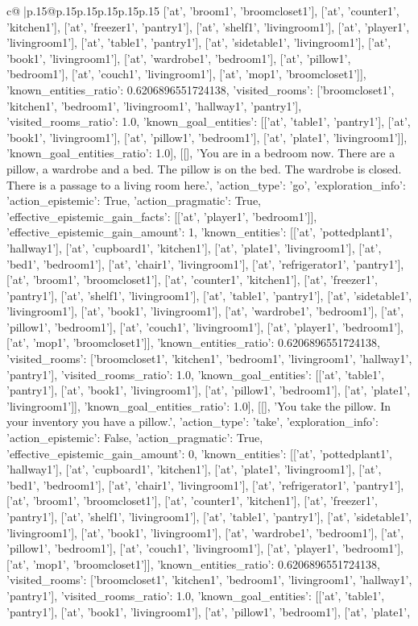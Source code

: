\documentclass{article}
\begin{document}
{\begin{supertabular}{c@{$\;$}|p{.15\linewidth}@{}p{.15\linewidth}p{.15\linewidth}p{.15\linewidth}p{.15\linewidth}p{.15\linewidth}}
{{{['at', 'broom1', 'broomcloset1'], ['at', 'counter1', 'kitchen1'], ['at', 'freezer1', 'pantry1'], ['at', 'shelf1', 'livingroom1'], ['at', 'player1', 'livingroom1'], ['at', 'table1', 'pantry1'], ['at', 'sidetable1', 'livingroom1'], ['at', 'book1', 'livingroom1'], ['at', 'wardrobe1', 'bedroom1'], ['at', 'pillow1', 'bedroom1'], ['at', 'couch1', 'livingroom1'], ['at', 'mop1', 'broomcloset1']], 'known_entities_ratio': 0.6206896551724138, 'visited_rooms': ['broomcloset1', 'kitchen1', 'bedroom1', 'livingroom1', 'hallway1', 'pantry1'], 'visited_rooms_ratio': 1.0, 'known_goal_entities': [['at', 'table1', 'pantry1'], ['at', 'book1', 'livingroom1'], ['at', 'pillow1', 'bedroom1'], ['at', 'plate1', 'livingroom1']], 'known_goal_entities_ratio': 1.0}}], [[], 'You are in a bedroom now. There are a pillow, a wardrobe and a bed. The pillow is on the bed. The wardrobe is closed. There is a passage to a living room here.', {'action_type': 'go', 'exploration_info': {'action_epistemic': True, 'action_pragmatic': True, 'effective_epistemic_gain_facts': [['at', 'player1', 'bedroom1']], 'effective_epistemic_gain_amount': 1, 'known_entities': [['at', 'pottedplant1', 'hallway1'], ['at', 'cupboard1', 'kitchen1'], ['at', 'plate1', 'livingroom1'], ['at', 'bed1', 'bedroom1'], ['at', 'chair1', 'livingroom1'], ['at', 'refrigerator1', 'pantry1'], ['at', 'broom1', 'broomcloset1'], ['at', 'counter1', 'kitchen1'], ['at', 'freezer1', 'pantry1'], ['at', 'shelf1', 'livingroom1'], ['at', 'table1', 'pantry1'], ['at', 'sidetable1', 'livingroom1'], ['at', 'book1', 'livingroom1'], ['at', 'wardrobe1', 'bedroom1'], ['at', 'pillow1', 'bedroom1'], ['at', 'couch1', 'livingroom1'], ['at', 'player1', 'bedroom1'], ['at', 'mop1', 'broomcloset1']], 'known_entities_ratio': 0.6206896551724138, 'visited_rooms': ['broomcloset1', 'kitchen1', 'bedroom1', 'livingroom1', 'hallway1', 'pantry1'], 'visited_rooms_ratio': 1.0, 'known_goal_entities': [['at', 'table1', 'pantry1'], ['at', 'book1', 'livingroom1'], ['at', 'pillow1', 'bedroom1'], ['at', 'plate1', 'livingroom1']], 'known_goal_entities_ratio': 1.0}}], [[], 'You take the pillow. In your inventory you have a pillow.', {'action_type': 'take', 'exploration_info': {'action_epistemic': False, 'action_pragmatic': True, 'effective_epistemic_gain_amount': 0, 'known_entities': [['at', 'pottedplant1', 'hallway1'], ['at', 'cupboard1', 'kitchen1'], ['at', 'plate1', 'livingroom1'], ['at', 'bed1', 'bedroom1'], ['at', 'chair1', 'livingroom1'], ['at', 'refrigerator1', 'pantry1'], ['at', 'broom1', 'broomcloset1'], ['at', 'counter1', 'kitchen1'], ['at', 'freezer1', 'pantry1'], ['at', 'shelf1', 'livingroom1'], ['at', 'table1', 'pantry1'], ['at', 'sidetable1', 'livingroom1'], ['at', 'book1', 'livingroom1'], ['at', 'wardrobe1', 'bedroom1'], ['at', 'pillow1', 'bedroom1'], ['at', 'couch1', 'livingroom1'], ['at', 'player1', 'bedroom1'], ['at', 'mop1', 'broomcloset1']], 'known_entities_ratio': 0.6206896551724138, 'visited_rooms': ['broomcloset1', 'kitchen1', 'bedroom1', 'livingroom1', 'hallway1', 'pantry1'], 'visited_rooms_ratio': 1.0, 'known_goal_entities': [['at', 'table1', 'pantry1'], ['at', 'book1', 'livingroom1'], ['at', 'pillow1', 'bedroom1'], ['at', 'plate1', }}}
\end{supertabular}}
\end{document}
